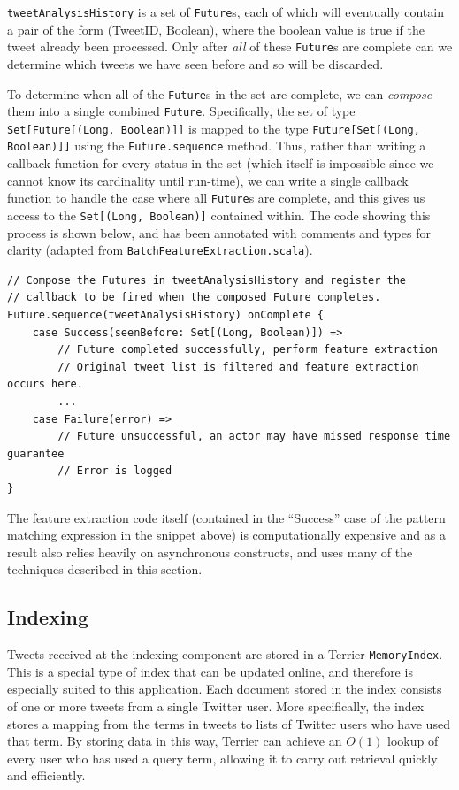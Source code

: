 \documentclass{l4proj}
\newcommand{\code}[1]{\texttt{#1}}
\begin{document}
\code{tweetAnalysisHistory} is a set of \code{Future}s, each of which will eventually contain a pair of the form (TweetID, Boolean), where the boolean value is true if the tweet already been processed. Only after \textit{all} of these \code{Future}s are complete can we determine which tweets we have seen before and so will be discarded.

To determine when all of the \code{Future}s in the set are complete, we can \textit{compose} them into a single combined \code{Future}. Specifically, the set of type \code{Set[Future[(Long, Boolean)]]} is mapped to the type \code{Future[Set[(Long, Boolean)]]} using the \code{Future.sequence} method. Thus, rather than writing a callback function for every status in the set (which itself is impossible since we cannot know its cardinality until run-time), we can write a single callback function to handle the case where all \code{Future}s are complete, and this gives us access to the \code{Set[(Long, Boolean)]} contained within. The code showing this process is shown below, and has been annotated with comments and types for clarity (adapted from  \code{BatchFeatureExtraction.scala}).

\begin{lstlisting}[caption=Composing Futures unto a single future and registering the onComplete callback.]
// Compose the Futures in tweetAnalysisHistory and register the
// callback to be fired when the composed Future completes.
Future.sequence(tweetAnalysisHistory) onComplete {
    case Success(seenBefore: Set[(Long, Boolean)]) =>
        // Future completed successfully, perform feature extraction
        // Original tweet list is filtered and feature extraction occurs here.
        ...
    case Failure(error) =>
        // Future unsuccessful, an actor may have missed response time guarantee
        // Error is logged
}
\end{lstlisting}

The feature extraction code itself (contained in the ``Success'' case of the pattern matching expression in the snippet above) is computationally expensive and as a result also relies heavily on asynchronous constructs, and uses many of the techniques described in this section.

        \subsection{Indexing}
        Tweets received at the indexing component are stored in a Terrier \code{MemoryIndex}. This is a special type of index that can be updated  online, and therefore is especially suited to this application. Each document stored in the index consists of one or more tweets from a single Twitter user. More specifically, the index stores a mapping from the terms in tweets to lists of Twitter users who have used that term. By storing data in this way, Terrier can achieve an $O(1)$ lookup of every user who has used a query term, allowing it to carry out retrieval quickly and efficiently.
        
\end{document}
